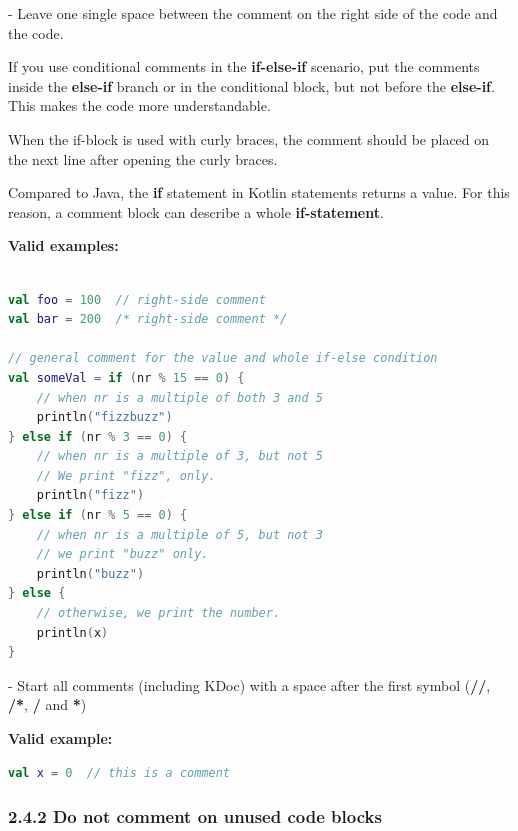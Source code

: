 - Leave one single space between the comment on the right side of the code and the code. 

If you use conditional comments in the \textbf{if-else-if} scenario, put the comments inside the \textbf{else-if} branch or in the conditional block, but not before the \textbf{else-if}. This makes the code more understandable.

When the if-block is used with curly braces, the comment should be placed on the next line after opening the curly braces.

Compared to Java, the \textbf{if} statement in Kotlin statements returns a value. For this reason, a comment block can describe a whole \textbf{if-statement}.



\textbf{Valid examples:}



\begin{lstlisting}[language=Kotlin]

val foo = 100  // right-side comment
val bar = 200  /* right-side comment */

// general comment for the value and whole if-else condition
val someVal = if (nr % 15 == 0) {
    // when nr is a multiple of both 3 and 5
    println("fizzbuzz")
} else if (nr % 3 == 0) {
    // when nr is a multiple of 3, but not 5
    // We print "fizz", only.
    println("fizz")
} else if (nr % 5 == 0) {
    // when nr is a multiple of 5, but not 3
    // we print "buzz" only.
    println("buzz")
} else {
    // otherwise, we print the number.
    println(x)
}
\end{lstlisting}


- Start all comments (including KDoc) with a space after the first symbol (\textbf{//}, \textbf{/*}, \textbf{/} and \textbf{*})



\textbf{Valid example:}



\begin{lstlisting}[language=Kotlin]
val x = 0  // this is a comment
\end{lstlisting}


\subsubsection*{\textbf{2.4.2 Do not comment on unused code blocks}}
\leavevmode\newline

\label{sec:2.4.2}



